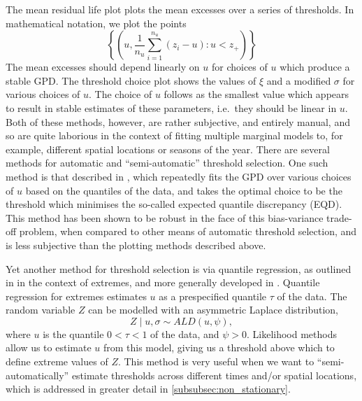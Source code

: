 \documentclass{article}
\numberwithin{equation}{section}
\begin{document}
The mean residual life plot plots the mean excesses over a series of thresholds.
In mathematical notation, we plot the points
\[
  \left\{\left( u, \frac{1}{n_u} \sum_{i=1}^{n_u}{\left(z_i - u\right)}: u < z_{+} \right) \right\} 
\]
The mean excesses should depend linearly on $u$ for choices of $u$ which produce a stable GPD. \cite{Coles2011-xu} 
The threshold choice plot shows the values of $\xi$ and a modified $\sigma$ for various choices of $u$. 
The choice of $u$ follows as the smallest value which appears to result in stable estimates of these parameters, i.e.\ they should be linear in $u$. 
Both of these methods, however, are rather subjective, and entirely manual, and so are quite laborious in the context of fitting multiple marginal models to, for example, different spatial locations or seasons of the year. 
There are several methods for automatic and ``semi-automatic'' threshold selection. 
One such method is that described in \cite{murphy2024automated}, which repeatedly fits the GPD over various choices of $u$ based on the quantiles of the data, and takes the optimal choice to be the threshold which minimises the so-called expected quantile discrepancy (EQD).
This method has been shown to be robust in the face of this bias-variance trade-off problem, when compared to other means of automatic threshold selection, and is less subjective than the plotting methods described above. 

Yet another method for threshold selection is via quantile regression, as outlined in \cite{Youngman2019} in the context of extremes, and more generally developed in \cite{Yu2001}. 
Quantile regression for extremes estimates $u$ as a prespecified quantile $\tau$ of the data. 
The random variable $Z$ can be modelled with an asymmetric Laplace distribution,
\begin{equation} \label{eq:asymmetric_laplace}
  Z \mid u, \sigma \sim ALD(u, \psi),
\end{equation}
where $u$ is the quantile $0 < \tau < 1$ of the data, and $\psi > 0$. 
Likelihood methods allow us to estimate $u$ from this model, giving us a threshold above which to define extreme values of $Z$.
This method is very useful when we want to ``semi-automatically'' estimate thresholds across different times and/or spatial locations, which is addressed in greater detail in \ref{subsubsec:non_stationary}.
\end{document}
